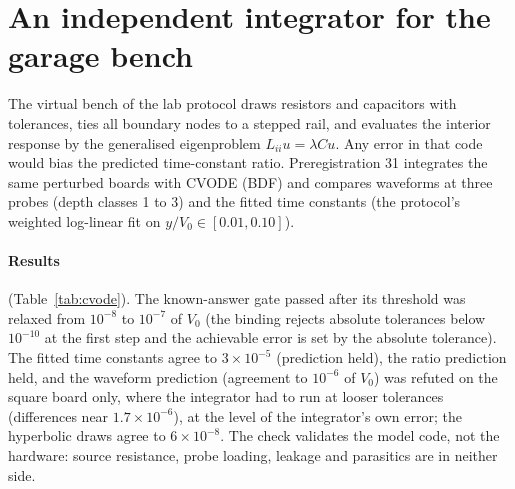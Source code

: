 \documentclass[11pt,a4paper]{article}
\begin{document}
\section{An independent integrator for the garage bench}\label{sec:cvode}
The virtual bench of the lab protocol draws resistors and capacitors with tolerances, ties all boundary nodes to a stepped rail, and evaluates the interior response by the generalised eigenproblem $L_{ii}u=\lambda Cu$. Any error in that code would bias the predicted time-constant ratio.
Preregistration 31 integrates the same perturbed boards with CVODE (BDF) and compares waveforms at three probes (depth classes 1 to 3) and the fitted time constants (the protocol's weighted log-linear fit on $y/V_0\in[0.01,0.10]$).

\paragraph{Results} (Table~\ref{tab:cvode}). The known-answer gate passed after its threshold was relaxed from $10^{-8}$ to $10^{-7}$ of $V_0$ (the binding rejects absolute tolerances below $10^{-10}$ at the first step and the achievable error is set by the absolute tolerance). The fitted time constants agree to $3\times10^{-5}$ (prediction held),
the ratio prediction held, and the waveform prediction (agreement to $10^{-6}$ of $V_0$) was refuted on the square board only, where the integrator had to run at looser tolerances (differences near $1.7\times10^{-6}$), at the level of the integrator's own error; the hyperbolic draws agree to $6\times10^{-8}$.
The check validates the model code, not the hardware: source resistance, probe loading, leakage and parasitics are in neither side.
\end{document}
